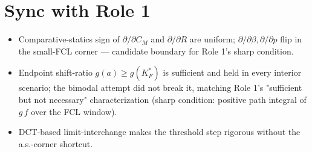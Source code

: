 \section*{Sync with Role 1}
\begin{itemize}
\item Comparative-statics sign of $\partial/\partial C_M$ and
$\partial/\partial R$ are uniform; $\partial/\partial \beta,\partial/
\partial p$ flip in the small-FCL corner --- candidate boundary for Role
1's sharp condition.
\item Endpoint shift-ratio $g(a)\ge g(K_F^*)$ is sufficient and held in
every interior scenario; the bimodal attempt did not break it, matching
Role 1's "sufficient but not necessary" characterization (sharp condition:
positive path integral of $g\,f$ over the FCL window).
\item DCT-based limit-interchange makes the threshold step rigorous
without the a.s.-corner shortcut.
\end{itemize}
